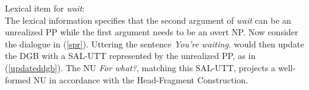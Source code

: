 \documentclass[output=paper
                ,modfonts
                ,nonflat
	        ,collection
	        ,collectionchapter
	        ,collectiontoclongg
 	        ,biblatex
                ,babelshorthands
                ,newtxmath
                ,draftmode
                ,colorlinks, citecolor=brown
]{./langsci/langscibook}
\begin{document}
{%
\ea
\label{wait}
Lexical item for \textit{wait}:\\
\z
%
The lexical information specifies that the second argument of \textit{wait} can be an unrealized PP while the first argument needs to be an overt NP. Now consider the dialogue in (\ref{spr}). Uttering
the sentence \textit{You're waiting.} would then update the DGB with a SAL-UTT represented by the unrealized PP, as in (\ref{updateddgb}).
%
\ea
\label{updateddgb}
\z
%
The NU \textit{For what?}, matching this SAL-UTT,
projects a well-formed NU in accordance with the Head-Fragment Construction.%


}
\end{document}
